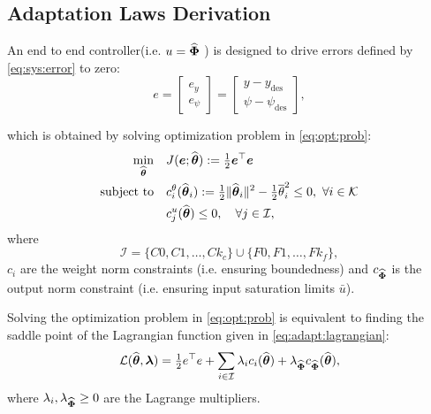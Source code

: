 \documentclass[letterpaper, journal]{IEEEtran}
\newcommand{\matL}{\mathcal{L}}   %
\newcommand{\tH}{\estwth}
\newcommand{\matI}{\mathcal{I}}
\begin{document}
\subsection{Adaptation Laws Derivation} \label{sec:ctrl:adap}

An end to end controller(i.e. $u=\widehat{\boldsymbol{\Phi}}$ ) is designed to drive errors defined by \eqref{eq:sys:error} to zero:
\begin{equation} \label{eq:sys:error}
    e 
    = 
    \begin{bmatrix}
      e_y \\
      e_\psi
    \end{bmatrix}
    =
    \begin{bmatrix} %
      y - y_{\mathrm{des}} \\
      \psi - \psi_{\mathrm{des}}
    \end{bmatrix}
    , 
\end{equation}

which is obtained by solving optimization problem in \eqref{eq:opt:prob}:
\begin{subequations} \label{eq:opt:prob} 
    \begin{align} 
        \min_{\widehat{\boldsymbol{\theta}}} \quad 
        & 
        J(\boldsymbol{e};\widehat{\boldsymbol{\theta}}):= \tfrac{1}{2} \boldsymbol{e}^\top \boldsymbol{e} \label{eq:opt:prob:obj} 
        \\ 
        \text{subject to} \quad 
        & 
        c^{\theta}_i(\widehat{\boldsymbol{\theta}}_i):=\tfrac{1}{2}\lVert \widehat{\boldsymbol{\theta}}_i \rVert^2 - \tfrac{1}{2}\overline{\theta}_i^2 \le 0, 
        \  \forall i\in\mathcal{K} \label{eq:opt:prob:const1} 
        \\ 
        & 
        c^{u}_{j}(\widehat{\boldsymbol{\theta}}) \le 0, 
        \quad \forall j\in\mathcal{I} \label{eq:opt:prob:const2} 
        ,
    \end{align}%
\end{subequations}
where
\[
  \matI 
  = 
  \{C0, C1, \dots, Ck_c\} 
  \cup 
  \{F0, F1, \dots, Fk_f\}
  ,
\] 
$c_i$ are the weight norm constraints (i.e. ensuring boundedness) and
$c_{\widehat{\boldsymbol{\Phi}}}$ is the output norm constraint (i.e. ensuring input saturation limits
$\bar{u}$).

Solving the optimization problem in \eqref{eq:opt:prob} is equivalent to finding the saddle point of the Lagrangian function given in \eqref{eq:adapt:lagrangian}:
\begin{equation}  \label{eq:adapt:lagrangian}
  \matL(\tH, \boldsymbol{\lambda}) 
  = 
  \tfrac{1}{2}e^{\top}e 
  + 
  \sum_{i \in \matI} 
  \lambda_i c_i(\tH) 
  + 
  \lambda_{\estNN} c_{\estNN}(\tH)
  ,
\end{equation}
where $\lambda_i, \lambda_{\widehat{\boldsymbol{\Phi}}} \ge 0$ are the Lagrange multipliers.
\end{document}
